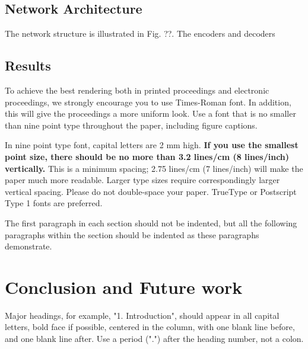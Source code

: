 \documentclass{article}
\begin{document}
\subsection{Network Architecture}
The network structure is illustrated in Fig. ??. The encoders and decoders




\subsection{Results}


To achieve the best rendering both in printed proceedings and electronic proceedings, we
strongly encourage you to use Times-Roman font.  In addition, this will give
the proceedings a more uniform look.  Use a font that is no smaller than nine
point type throughout the paper, including figure captions.

In nine point type font, capital letters are 2 mm high.  {\bf If you use the
smallest point size, there should be no more than 3.2 lines/cm (8 lines/inch)
vertically.}  This is a minimum spacing; 2.75 lines/cm (7 lines/inch) will make
the paper much more readable.  Larger type sizes require correspondingly larger
vertical spacing.  Please do not double-space your paper.  TrueType or
Postscript Type 1 fonts are preferred.

The first paragraph in each section should not be indented, but all the
following paragraphs within the section should be indented as these paragraphs
demonstrate.


\section{Conclusion and Future work}
\label{sec:con}

Major headings, for example, "1. Introduction", should appear in all capital
letters, bold face if possible, centered in the column, with one blank line
before, and one blank line after. Use a period (".") after the heading number,
not a colon.
\end{document}
